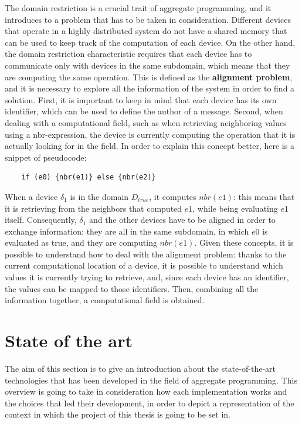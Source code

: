 The domain restriction is a crucial trait of aggregate programming, and it introduces to a problem that has to be taken in consideration. Different devices that operate in a highly distributed system do not have a shared memory that can be used to keep track of the computation of each device. On the other hand, the domain restriction characteristic requires that each device has to communicate only with devices in the same subdomain, which means that they are computing the same operation.\newline
This is defined as the \textbf{alignment problem}, and it is necessary to explore all the information of the system in order to find a solution. First, it is important to keep in mind that each device has its own identifier, which can be used to define the author of a message. Second, when dealing with a computational field, such as when retrieving neighboring values using a nbr-expression, the device is currently computing the operation that it is actually looking for in the field.\newline
In order to explain this concept better, here is a snippet of pseudocode:
\begin{lstlisting}
    if (e0) {nbr(e1)} else {nbr(e2)}
\end{lstlisting}
When a device $\delta_1$ is in the domain $D_{true}$, it computes $nbr(e1)$: this means that it is retrieving from the neighbors that computed $e1$, while being evaluating $e1$ itself.\newline
Consequently, $\delta_1$ and the other devices have to be aligned in order to exchange information: they are all in the same subdomain, in which $e0$ is evaluated as true, and they are computing $nbr(e1)$.\newline
Given these concepts, it is possible to understand how to deal with the alignment problem: thanks to the current computational location of a device, it is possible to understand which values it is currently trying to retrieve, and, since each device has an identifier, the values can be mapped to those identifiers. Then, combining all the information together, a computational field is obtained.

\section{State of the art}
The aim of this section is to give an introduction about the state-of-the-art technologies that has been developed in the field of aggregate programming. This overview is going to take in consideration how each implementation works and the choices that led their development, in order to depict a representation of the context in which the project of this thesis is going to be set in.

